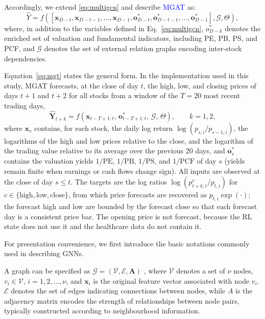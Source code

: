 \documentclass[pdflatex,sn-mathphys-num]{sn-jnl}%
\theoremstyle{thmstyleone}%
\theoremstyle{thmstyletwo}%
\theoremstyle{thmstylethree}%
\begin{document}
Accordingly, we extend \eqref{eq:multigcn} and describe \textcolor{blue}{MGAT} as:
\begin{equation}
\hat{Y} = f\!\left(
\left[\mathbf{x}_{D-t}, \mathbf{x}_{D-t-1}, \ldots, \mathbf{x}_{D-1},
\mathbf{o}^{*}_{D-t}, \mathbf{o}^{*}_{D-t-1}, \ldots, \mathbf{o}^{*}_{D-1}\right],
\mathcal{G}, \Theta
\right),
\label{eq:mgt}
\end{equation}
where, in addition to the variables defined in Eq.~\eqref{eq:multigcn},
$o^{*}_{D-k}$ denotes the enriched set of valuation and fundamental
indicators, including PE, PB, PS, and PCF, and $\mathcal{G}$ denotes
the set of external relation graphs encoding inter-stock dependencies.
{\color{blue}Equation~\eqref{eq:mgt} states the general form. In the implementation used in this study, MGAT forecasts, at the close of day $t$, the high, low, and closing prices of days $t+1$ and $t+2$ for all stocks from a window of the $T=20$ most recent trading days,
\[
\hat{\mathbf{Y}}_{t+k}=f\!\left(\mathbf{x}_{t-T+1:t},\,\mathbf{o}^{*}_{t-T+1:t},\,\mathcal{G},\,\Theta\right),\qquad k=1,2,
\]
where $\mathbf{x}_{s}$ contains, for each stock, the daily log return $\log(p_{s,i}/p_{s-1,i})$, the logarithms of the high and low prices relative to the close, and the logarithm of the trading value relative to its average over the previous 20 days, and $\mathbf{o}^{*}_{s}$ contains the valuation yields $1/\mathrm{PE}$, $1/\mathrm{PB}$, $1/\mathrm{PS}$, and $1/\mathrm{PCF}$ of day $s$ (yields remain finite when earnings or cash flows change sign). All inputs are observed at the close of day $s\le t$. The targets are the log ratios $\log(p^{c}_{t+k,i}/p_{t,i})$ for $c\in\{\mathrm{high},\mathrm{low},\mathrm{close}\}$, from which price forecasts are recovered as $p_{t,i}\exp(\cdot)$; the forecast high and low are bounded by the forecast close so that each forecast day is a consistent price bar. The opening price is not forecast, because the RL state does not use it and the healthcare data do not contain it.\par}
For presentation convenience, we first introduce the basic notations commonly used in describing GNNs.

A graph can be specified as $\mathcal{G}=(\mathcal{V},\mathcal{E},\mathbf{A})$ \citep{Sun2025GTC}, where $\mathcal{V}$ denotes a set of $\nu$ nodes, $v_i\in\mathcal{V}$, $i=1,2,\ldots,\nu$, and $\mathbf{x}_i$ is the original feature vector associated with node $v_i$.
$\mathcal{E}$ denotes the set of edges indicating connections between nodes, while $A$ is the adjacency matrix encodes the strength of relationships between node pairs, typically constructed according to neighbourhood information.
\end{document}
